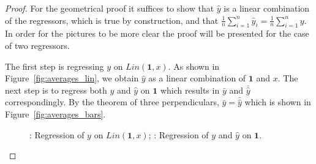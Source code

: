 \begin{proof}
For the geometrical proof it suffices to show that $\hat y$ is a linear combination of the regressors, which is true by construction,
and that $\frac{1}{n} \sum_{i=1}^{n} \hat y_i = \frac{1}{n} \sum_{i=1}^{n} y$. In order for the pictures to be more clear the proof will be presented for the case of two regressors.

The first step is regressing $y$ on $Lin(\mathbf{1}, x)$. As shown in Figure~\ref{fig:averages_lin}, we obtain $\hat y$ as a linear combination of $\mathbf{1}$ and $x$.
The next step is to regress both $y$ and $\hat y$ on $\mathbf{1}$ which results in $\bar y$ and $\bar \hat y$ correspondingly.
By the theorem of three perpendiculars, $\bar y = \bar \hat y$ which is shown in Figure~\ref{fig:averages_bars}.

\begin{figure}[ht!]
\begin{center}
\hspace{4ex}
\caption{: Regression of $y$ on $Lin(\mathbf{1},x)$; : Regression of $y$ and $\hat y$ on $\mathbf{1}$.}
\end{center}
\end{figure}



\end{proof}

